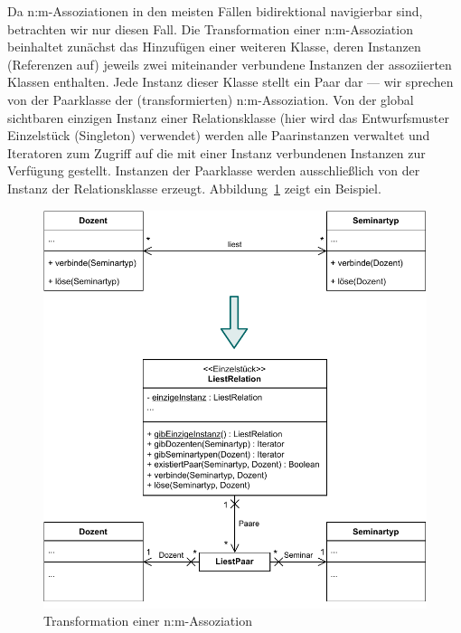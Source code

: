 \pagebreak %


\vspace{2mm} %

Da n:m-Assoziationen in den meisten Fällen bidirektional navigierbar sind, betrachten wir nur diesen Fall. Die Transformation einer n:m-Assoziation beinhaltet zunächst das Hinzufügen einer weiteren Klasse, deren Instanzen (Referenzen auf) jeweils zwei miteinander verbundene Instanzen der assoziierten Klassen enthalten. Jede Instanz dieser Klasse stellt ein Paar dar — wir sprechen von der Paarklasse der (transformierten) n:m-Assoziation. Von der global sichtbaren einzigen Instanz einer Relationsklasse (hier wird das Entwurfsmuster Einzelstück (Singleton) verwendet) werden alle Paarinstanzen verwaltet und Iteratoren zum Zugriff auf die mit einer Instanz verbundenen Instanzen zur Verfügung gestellt. Instanzen der Paarklasse werden ausschließlich von der Instanz der Relationsklasse erzeugt. Abbildung~\ref{fig:transformationen_abb_h} zeigt ein Beispiel.

\begin{figure}[h!]
	\centering
	\includegraphics[scale=1.0]{Bilder/Kapitel-9/transformationen_abb_h.pdf}
	\vspace{\baselineskip} %
	\caption{Transformation einer n:m-Assoziation}
	\label{fig:transformationen_abb_h}
\end{figure}

